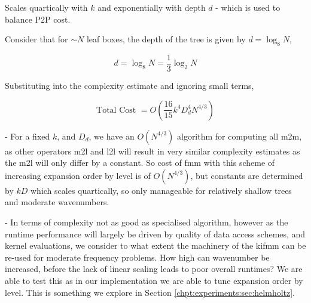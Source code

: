 Scales quartically with $k$ and exponentially with depth $d$ - which is used to balance P2P cost.

Consider that for $\sim N$ leaf boxes, the depth of the tree is given by $d = \log_8{N}$,

$$
d = \log_8{N} = \frac{1}{3} \log_2{N}
$$

Substituting into the complexity estimate and ignoring small terms,

$$
\text{Total Cost } = O \left( \frac{16}{15}  k^4 D_d^4 N^{4/3}  \right)
$$

- For a fixed $k$, and $D_d$, we have an $O(N^{4/3})$ algorithm for computing all \acrshort{m2m}, as other operators \acrshort{m2l} and \acrshort{l2l} will result in very similar complexity estimates as the \acrshort{m2l} will only differ by a constant. So cost of \acrshort{fmm} with this scheme of increasing expansion order by level is of $O(N^{4/3})$, but constants are determined by $kD$ which scales quartically, so only manageable for relatively shallow trees and moderate wavenumbers.

- In terms of complexity not as good as specialised algorithm, however as the runtime performance will largely be driven by quality of data access schemes, and kernel evaluations, we consider to what extent the machinery of the \acrshort{kifmm} can be re-used for moderate frequency problems. How high can wavenumber be increased, before the lack of linear scaling leads to poor overall runtimes? We are able to test this as in our implementation we are able to tune expansion order by level. This is something we explore in Section \ref{chpt:experiments:sec:helmholtz}.

